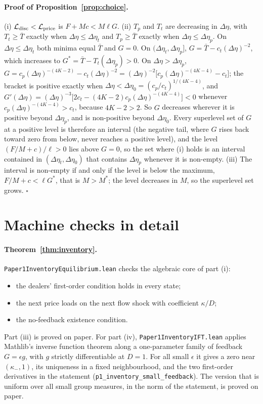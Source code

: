 \documentclass[12pt]{article}
\theoremstyle{definition}
\theoremstyle{remark}
\begin{document}
\paragraph{Proof of Proposition~\ref{prop:choice}.}
 (i) $\mathcal L_{\rm disc}<\mathcal L_{\rm price}$ is $F+Mc<M\ell G$. (ii) $T_p$ and $T_t$ are decreasing in $\Delta\eta$, with $T_t\ge\bar T$ exactly when $\Delta\eta\le\Delta\eta_t$ and $T_p\ge\bar T$ exactly when $\Delta\eta\le\Delta\eta_p$. On $\Delta\eta\le\Delta\eta_t$ both minima equal $\bar T$ and $G=0$. On $(\Delta\eta_t,\Delta\eta_p]$, $G=\bar T-c_t(\Delta\eta)^{-2}$, which increases to $G^*=\bar T-T_t(\Delta\eta_p)>0$. On $\Delta\eta>\Delta\eta_p$, $G=c_p(\Delta\eta)^{-(4K-2)}-c_t(\Delta\eta)^{-2}=(\Delta\eta)^{-2}\bigl[c_p(\Delta\eta)^{-(4K-4)}-c_t\bigr]$; the bracket is positive exactly when $\Delta\eta<\Delta\eta_0=(c_p/c_t)^{1/(4K-4)}$, and $G'(\Delta\eta)=(\Delta\eta)^{-3}\bigl[2c_t-(4K-2)c_p(\Delta\eta)^{-(4K-4)}\bigr]<0$ whenever $c_p(\Delta\eta)^{-(4K-4)}>c_t$, because $4K-2>2$. So $G$ decreases wherever it is positive beyond $\Delta\eta_p$, and is non-positive beyond $\Delta\eta_0$. Every superlevel set of $G$ at a positive level is therefore an interval (the negative tail, where $G$ rises back toward zero from below, never reaches a positive level), and the level $(F/M+c)/\ell>0$ lies above $G=0$, so the set where (i) holds is an interval contained in $(\Delta\eta_t,\Delta\eta_0)$ that contains $\Delta\eta_p$ whenever it is non-empty. (iii) The interval is non-empty if and only if the level is below the maximum, $F/M+c<\ell G^*$, that is $M>M^*$; the level decreases in $M$, so the superlevel set grows. $\square$


\section{Machine checks in detail}\label{app:mc}

\paragraph{Theorem~\ref{thm:inventory}.}
\nolinkurl{Paper1InventoryEquilibrium.lean} checks the algebraic core of part (i):
\begin{itemize}[itemsep=1pt,topsep=2pt]
\item the dealers' first-order condition holds in every state;
\item the next price loads on the next flow shock with coefficient $\kappa/D$;
\item the no-feedback existence condition.
\end{itemize}
Part (iii) is proved on paper. For part (iv), \nolinkurl{Paper1InventoryIFT.lean} applies Mathlib's inverse function theorem along a one-parameter family of feedback $G=\epsilon g$, with $g$ strictly differentiable at $D=1$. For all small $\epsilon$ it gives a zero near $(\kappa_-,1)$, its uniqueness in a fixed neighbourhood, and the two first-order derivatives in the statement (\nolinkurl{p1_inventory_small_feedback}). The version that is uniform over all small group measures, in the norm of the statement, is proved on paper.
\end{document}

